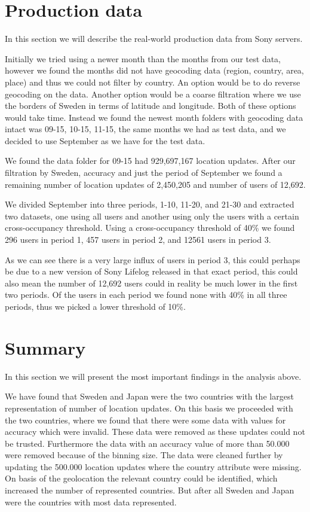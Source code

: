 \section{Production data}
In this section we will describe the real-world production data from Sony servers.

Initially we tried using a newer month than the months from our test data, however we found the months did not have geocoding data (region, country, area, place) and thus we could not filter by country. An option would be to do reverse geocoding on the data. Another option would be a coarse filtration where we use the borders of Sweden in terms of latitude and longitude. Both of these options would take time. Instead we found the newest month folders with geocoding data intact was 09-15, 10-15, 11-15, the same months we had as test data, and we decided to use September as we have for the test data.

We found the data folder for 09-15 had 929,697,167 location updates. After our filtration by Sweden, accuracy and just the period of September we found a remaining number of location updates of 2,450,205 and number of users of 12,692.

We divided September into three periods, 1-10, 11-20, and 21-30 and extracted two datasets, one using all users and another using only the users with a certain cross-occupancy threshold. Using a cross-occupancy threshold of 40\% we found 296 users in period 1, 457 users in period 2, and 12561 users in period 3.

As we can see there is a very large influx of users in period 3, this could perhaps be due to a new version of Sony Lifelog released in that exact period, this could also mean the number of 12,692 users could in reality be much lower in the first two periods. Of the users in each period we found none with 40\% in all three periods, thus we picked a lower threshold of 10\%.




\section{Summary}
In this section we will present the most important findings in the analysis above. 

We have found that Sweden and Japan were the two countries with the largest representation of number of location updates.  On this basis we proceeded with the two countries, where we found that there were some data with values for accuracy which were invalid. These data were removed as these updates could not be trusted. Furthermore the data with an accuracy value of more than 50.000 were removed because of the binning size. 
The data were cleaned further by updating the 500.000 location updates where the country attribute were missing. On basis of the geolocation the relevant country could be identified, which increased the number of represented countries. But after all Sweden and Japan were the countries with most data represented. 

